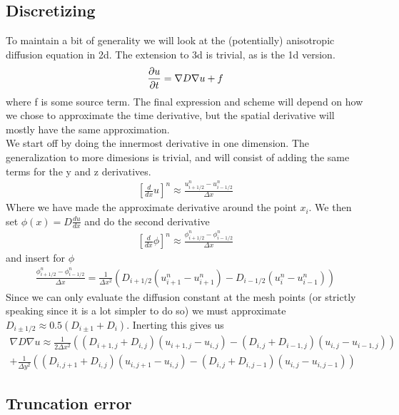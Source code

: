 \subsection{Discretizing}\label{discretizing}

To maintain a bit of generality we will look at the (potentially) anisotropic diffusion equation in 2d. The extension to 3d is trivial, as is the 1d version.
\begin{equation}
 \frac{\partial u}{\partial t} = \nabla D\nabla u +f
\end{equation}
where f is some source term. 
The final expression and scheme will depend on how we chose to approximate the time derivative, but the spatial derivative will mostly have the same approximation. \\
We start off by doing the innermost derivative in one dimension. 
The generalization to more dimesions is trivial, and will consist of adding the same terms for the y and z derivatives. 
\begin{align*}
 \left[\frac{d}{dx}u\right]^n \approx \frac{u^n_{i+1/2}-u^n_{i-1/2}}{\Delta x}
\end{align*}
Where we have made the approximate derivative around the point $x_i$. 
We then set $\phi(x)=D\frac{du}{dx}$ and do the second derivative
\begin{align*}
  \left[\frac{d}{dx}\phi\right]^n \approx \frac{\phi^n_{i+1/2}-\phi^n_{i-1/2}}{\Delta x}
\end{align*}
and insert for $\phi$
\begin{align*}
 \frac{\phi^n_{i+1/2}-\phi^n_{i-1/2}}{\Delta x} = \frac{1}{\Delta x^2}\left(D_{i+1/2}(u^n_{i+1}-u^n_{i+1}) -D_{i-1/2}(u^n_{i}-u^n_{i-1})\right)
\end{align*}
Since we can only evaluate the diffusion constant at the mesh points (or strictly speaking since it is a lot simpler to do so) we must approximate $D_{i\pm1/2}\approx0.5(D_{i\pm1}+D_i)$. 
Inerting this gives us 
\begin{align*}
 \nabla D\nabla u\approx\frac{1}{2\Delta x^2}\left((D_{i+1,j}+D_{i,j})(u_{i+1,j}-u_{i,j})-(D_{i,j}+D_{i-1,j})(u_{i,j}-u_{i-1,j})\right) \\
 +\frac{1}{\Delta y^2}\left((D_{i,j+1}+D_{i,j})(u_{i,j+1}-u_{i,j})-(D_{i,j}+D_{i,j-1})(u_{i,j}-u_{i,j-1})\right)
\end{align*}


\subsection{Truncation error}\label{truncation_error}

